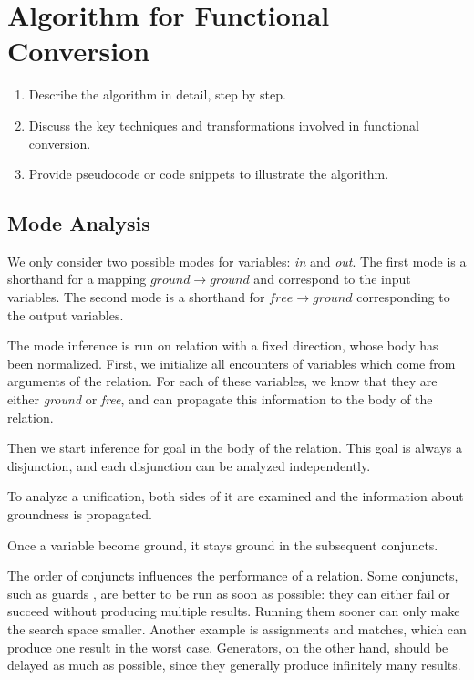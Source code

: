 \section{Algorithm for Functional Conversion}

\begin{enumerate}
    \item Describe the algorithm in detail, step by step.
    \item Discuss the key techniques and transformations involved in functional conversion.
    \item Provide pseudocode or code snippets to illustrate the algorithm.
\end{enumerate}

\subsection{Mode Analysis}

We only consider two possible modes for variables: \emph{in} and \emph{out}. 
The first mode is a shorthand for a mapping $ground \rightarrow ground$ and correspond to the input variables. 
The second mode is a shorthand for $free \rightarrow ground$ corresponding to the output variables. 

The mode inference is run on relation with a fixed direction, whose body has been normalized. 
First, we initialize all encounters of variables which come from arguments of the relation. 
For each of these variables, we know that they are either \emph{ground} or \emph{free}, and can propagate this information to the body of the relation. 

Then we start inference for goal in the body of the relation. 
This goal is always a disjunction, and each disjunction can be analyzed independently. 

To analyze a unification, both sides of it are examined and the information about groundness is propagated. 

Once a variable become ground, it stays ground in the subsequent conjuncts. 

The order of conjuncts influences the performance of a relation. 
Some conjuncts, such as guards , are better to be run as soon as possible: they can either fail or succeed without producing multiple results. 
Running them sooner can only make the search space smaller. 
Another example is assignments and matches, which can produce one result in the worst case. 
Generators, on the other hand, should be delayed as much as possible, since they generally produce infinitely many results. 

